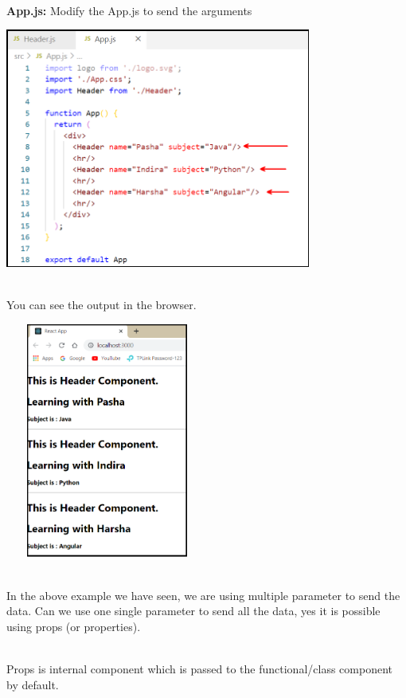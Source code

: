 \documentclass{article}
\begin{document}
\noindent 

\noindent \\
\textbf{App.js:} Modify the App.js to send the arguments

\begin{center}
	\noindent \includegraphics*[width=3.96in, height=3.10in]{IMG-08-08}
\end{center}

\noindent 
\newpage
\noindent \\
You can see the output in the browser.

\begin{center}
	\noindent \includegraphics*[width=2.63in, height=3.05in]{IMG-08-09}
\end{center}

\noindent \\
In the above example we have seen, we are using multiple parameter to send the data. Can we use one single parameter to send all the data, yes it is possible using props (or properties).

\noindent \\
Props is internal component which is passed to the functional/class component by default.
\end{document}
